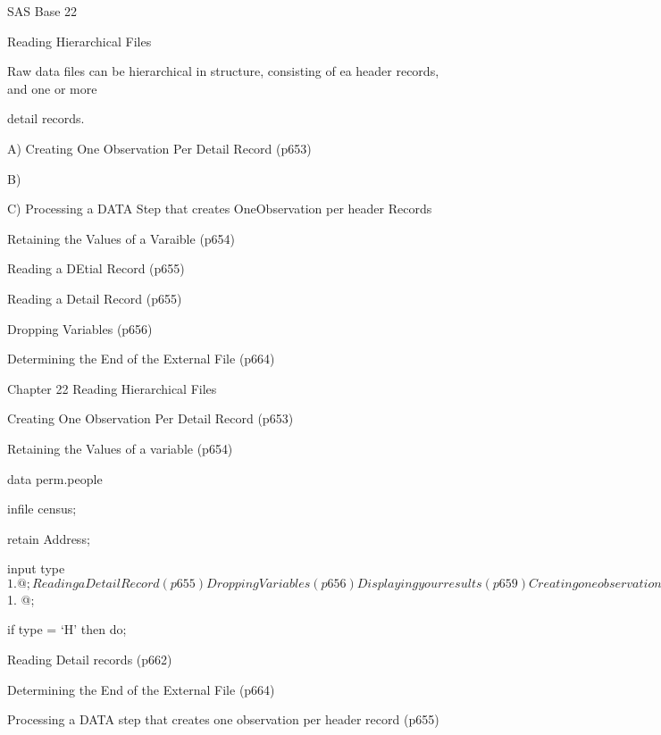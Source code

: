 \newpage


SAS Base 22

Reading Hierarchical Files

Raw data files can be hierarchical in structure, consisting of ea header records, and one or more

detail records.


A) Creating One Observation Per Detail Record (p653)

B)

C) Processing a DATA Step that creates OneObservation per header Records

Retaining the Values of a Varaible (p654)

Reading a DEtial Record (p655)

Reading a Detail Record (p655)

Dropping Variables (p656)

Determining the End of the External File (p664)


Chapter 22 Reading Hierarchical Files

Creating One Observation Per Detail Record (p653)

 



Retaining the Values of a variable (p654)







data perm.people

  infile census;

  retain Address;

     input type $1. @;
 


Reading a Detail Record (p655)

Dropping Variables (p656)

Displaying your results (p659)

Creating one observation per header record (p660)

DO group actions for header recorders (p661)

 







data perm.people

  infile census;

  retain Address;

  input type $1. @;

     if type = ‘H’ then do;
 


Reading Detail records (p662)

Determining the End of the External File (p664)

Processing a DATA step that creates one observation per header record (p655)




